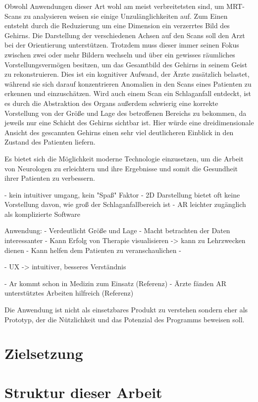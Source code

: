 Obwohl Anwendungen dieser Art wohl am meist verbreitetsten sind, um MRT-Scans zu analysieren 
weisen sie einige Unzulänglichkeiten auf.
Zum Einen entsteht durch die Reduzierung um eine Dimension ein verzerrtes Bild des Gehirns. Die Darstellung der verschiedenen Achsen auf den Scans soll den Arzt bei der Orientierung unterstützen. Trotzdem muss dieser immer seinen Fokus zwischen zwei oder mehr Bildern wechseln und über ein gewisses räumliches Vorstellungsvermögen besitzen, um das Gesamtbild des Gehirns in seinem Geist zu rekonstruieren. Dies ist ein kognitiver Aufwand, der Ärzte zusätzlich belastet, während sie sich darauf konzentrieren Anomalien in den Scans eines Patienten zu erkennen und einzuschätzen. 
Wird auch einem Scan ein Schlaganfall entdeckt, ist es durch die Abstraktion des Organs außerdem schwierig eine korrekte Vorstellung von der Größe und Lage des betroffenen Bereichs zu bekommen, da jeweils nur eine Schicht des Gehirns sichtbar ist. 
Hier würde eine dreidimensionale Ansicht des gescannten Gehirns einen sehr viel deutlicheren Einblick in den Zustand des Patienten liefern. 

Es bietet sich die Möglichkeit moderne Technologie einzusetzen, um die Arbeit von Neurologen zu erleichtern und ihre Ergebnisse und somit die Gesundheit ihrer Patienten zu verbessern.


- kein intuitiver umgang, kein "Spaß" Faktor
- 2D Darstellung bietet oft keine Vorstellung davon, wie groß der Schlaganfallbereich ist
- AR leichter zugänglich als komplizierte Software

Anwendung:
- Verdeutlicht Größe und Lage
- Macht betrachten der Daten interessanter
- Kann Erfolg von Therapie visualisieren
-> kann zu Lehrzwecken dienen
- Kann helfen dem Patienten zu veranschaulichen
- 

- UX -> intuitiver, besseres Verständnis

- Ar kommt schon in Medizin zum Einsatz (Referenz)
- Ärzte fänden AR unterstütztes Arbeiten hilfreich (Referenz)

Die Anwendung ist nicht als einsetzbares Produkt zu verstehen sondern eher als Prototyp, der die Nützlichkeit und das Potenzial des Programms beweisen soll.

\section{Zielsetzung}

\section{Struktur dieser Arbeit}

